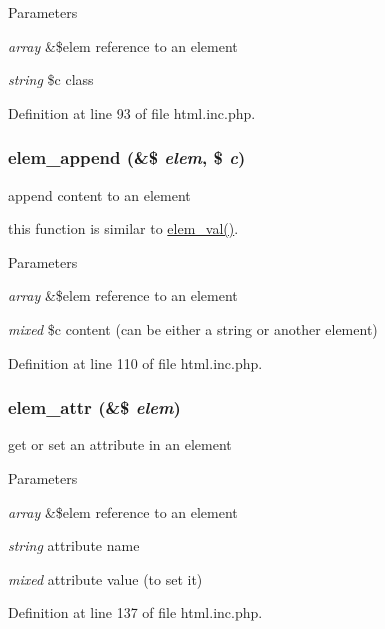 \begin{DoxyParams}{Parameters}
\item[{\em array}]\&\$elem reference to an element \item[{\em string}]\$c class \end{DoxyParams}


Definition at line 93 of file html.inc.php.

\hypertarget{html_8inc_8php_aea37c451f5d55e2efbb2656e340c1dae}{
\subsubsection[{elem\_\-append}]{\setlength{\rightskip}{0pt plus 5cm}elem\_\-append (\&\$ {\em elem}, \/  \$ {\em c})}}
\label{html_8inc_8php_aea37c451f5d55e2efbb2656e340c1dae}
append content to an element

this function is similar to \hyperlink{html_8inc_8php_ae28d850c3c906c6884462ca89c06f59b}{elem\_\-val()}. 
\begin{DoxyParams}{Parameters}
\item[{\em array}]\&\$elem reference to an element \item[{\em mixed}]\$c content (can be either a string or another element) \end{DoxyParams}


Definition at line 110 of file html.inc.php.

\hypertarget{html_8inc_8php_a894dc22f3b7668c59364599909162b8e}{
\subsubsection[{elem\_\-attr}]{\setlength{\rightskip}{0pt plus 5cm}elem\_\-attr (\&\$ {\em elem})}}
\label{html_8inc_8php_a894dc22f3b7668c59364599909162b8e}
get or set an attribute in an element


\begin{DoxyParams}{Parameters}
\item[{\em array}]\&\$elem reference to an element \item[{\em string}]attribute name \item[{\em mixed}]attribute value (to set it) \end{DoxyParams}


Definition at line 137 of file html.inc.php.

